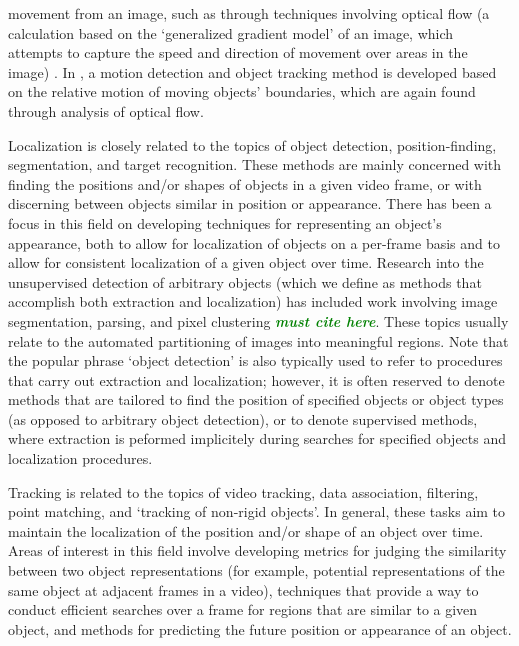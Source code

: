 \documentclass[smallcondensed, final]{svjour3}
\newcommand{\willie}[1]{\textcolor{green}{\textsf{\emph{\textbf{\textcolor{green}{#1}}}}}}
\begin{document}
movement from an image, such as through techniques involving optical flow (a calculation based on the `generalized gradient model' of an image, which attempts to capture the speed and direction of movement over areas in the image) \citep{horn_1981, bobick_2001}. In \citep{black_2000}, a motion detection and object tracking method is developed based on the relative motion of moving objects' boundaries, which are again found through analysis of optical flow.

Localization is closely related to the topics of object detection, position-finding, segmentation, and target recognition. These methods are mainly concerned with finding the positions and/or shapes of objects in a given video frame, or with discerning between objects similar in position or appearance. There has been a focus in this field on developing techniques for representing an object's appearance, both to allow for localization of objects on a per-frame basis and to allow for consistent localization of a given object over time. Research into the unsupervised detection of arbitrary objects (which we define as methods that accomplish both extraction and localization) has included work involving image segmentation, parsing, and pixel clustering \willie{must cite here}. These topics usually relate to the automated partitioning of images into meaningful regions. Note that the popular phrase `object detection' is also typically used to refer to procedures that carry out extraction and localization; however, it is often reserved to denote methods that are tailored to find the position of specified objects or object types (as opposed to arbitrary object detection), or to denote supervised methods, where extraction is peformed implicitely during searches for specified objects and localization procedures.

Tracking is related to the topics of video tracking, data association, filtering, point matching, and `tracking of non-rigid objects'. In general, these tasks aim to maintain the localization of the position and/or shape of an object over time. Areas of interest in this field involve developing metrics for judging the similarity between two object representations (for example, potential representations of the same object at adjacent frames in a video), techniques that provide a way to conduct efficient searches over a frame for regions that are similar to a given object, and methods for predicting the future position or appearance of an object. 
\end{document}
